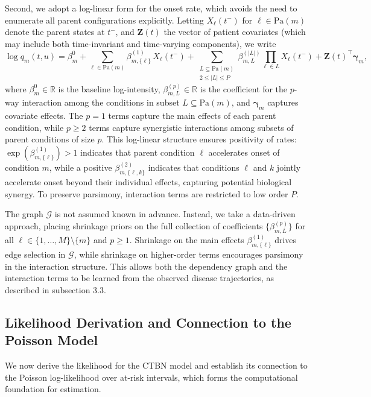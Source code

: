 \documentclass[12pt]{article}
\begin{document}
Second, we adopt a log-linear form for the onset rate, which avoids the need to enumerate all parent configurations explicitly. Letting $X_\ell(t^-)$ for $\ell \in \mathrm{Pa}(m)$ denote the parent states at $t^-$, and $\mathbf{Z}(t)$ the vector of patient covariates (which may include both time-invariant and time-varying components), we write
\begin{equation}\label{eqn1}
\log q_m(t, u) = \beta^0_m + \sum_{\ell \in \mathrm{Pa}(m)} \beta_{m,\{\ell\}}^{(1)}\, X_\ell(t^-) + \sum_{\substack{L \subseteq \mathrm{Pa}(m) \\ 2 \leq |L| \leq P}} \beta_{m,L}^{(|L|)} \prod_{\ell \in L} X_\ell(t^-) + \mathbf{Z}(t)^\top \boldsymbol{\gamma}_m,
\end{equation}
where $\beta^0_m \in \mathbb{R}$ is the baseline log-intensity, $\beta_{m,L}^{(p)} \in \mathbb{R}$ is the coefficient for the $p$-way interaction among the conditions in subset $L \subseteq \mathrm{Pa}(m)$, and $\boldsymbol{\gamma}_m$ captures covariate effects. The $p=1$ terms capture the main effects of each parent condition, while $p \geq 2$ terms capture synergistic interactions among subsets of parent conditions of size $p$. This log-linear structure ensures positivity of rates: $\exp(\beta_{m,\{\ell\}}^{(1)}) > 1$ indicates that parent condition $\ell$ accelerates onset of condition $m$, while a positive $\beta_{m,\{\ell,k\}}^{(2)}$ indicates that conditions $\ell$ and $k$ jointly accelerate onset beyond their individual effects, capturing potential biological synergy. To preserve parsimony, interaction terms are restricted to low order $P$.

The graph $\mathcal{G}$ is not assumed known in advance. Instead, we take a data-driven approach, placing shrinkage priors on the full collection of coefficients $\{\beta_{m,L}^{(p)}\}$ for all $\ell \in \{1,\dots,M\}\setminus\{m\}$ and $p \geq 1$. Shrinkage on the main effects $\beta_{m,\{\ell\}}^{(1)}$ drives edge selection in $\mathcal{G}$, while shrinkage on higher-order terms encourages parsimony in the interaction structure. This allows both the dependency graph and the interaction terms to be learned from the observed disease trajectories, as described in subsection 3.3.


\subsection{Likelihood Derivation and Connection to the Poisson Model}

We now derive the likelihood for the CTBN model and establish its connection to the Poisson log-likelihood over at-risk intervals, which forms the computational foundation for estimation.
\end{document}
